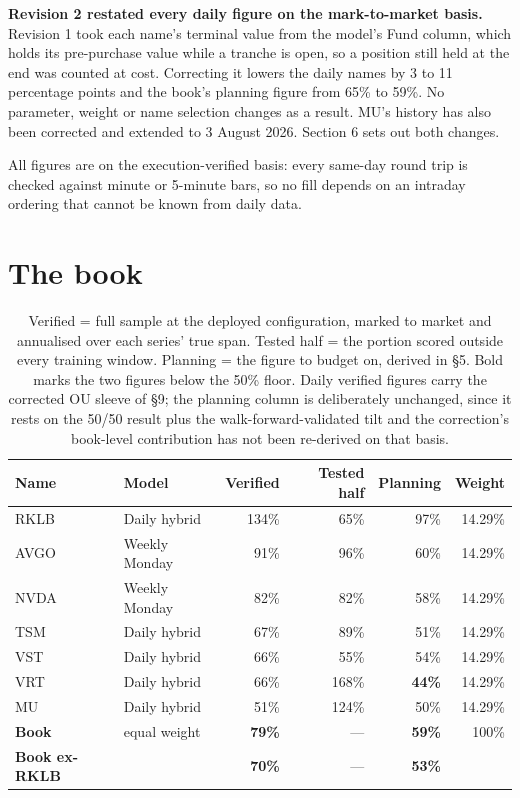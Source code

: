 \documentclass[11pt]{article}
\begin{document}
\begin{titlepage}
{{\textbf{Revision 2 restated every daily figure on the mark-to-market basis.} Revision 1 took each
name's terminal value from the model's Fund column, which holds its pre-purchase value while a
tranche is open, so a position still held at the end was counted at cost. Correcting it lowers
the daily names by 3 to 11 percentage points and the book's planning figure from 65\% to 59\%.
No parameter, weight or name selection changes as a result. MU's history has also been corrected
and extended to 3 August 2026. Section 6 sets out both changes.

All figures are on the execution-verified basis: every same-day round trip is checked against
minute or 5-minute bars, so no fill depends on an intraday ordering that cannot be known from
daily data.}}
\end{titlepage}

\section{The book}

\begin{table}[H]\centering\small
\begin{tabular}{llrrrr}
\toprule
\textbf{Name} & \textbf{Model} & \textbf{Verified} & \textbf{Tested half} & \textbf{Planning} &
\textbf{Weight}\\
\midrule
\rowcolor{bckeep} RKLB & Daily hybrid   & 134\% & 65\%  & 97\%  & 14.29\%\\
AVGO & Weekly Monday  & 91\%  & 96\%  & 60\%  & 14.29\%\\
\rowcolor{bckeep} NVDA & Weekly Monday  & 82\%  & 82\%  & 58\%  & 14.29\%\\
TSM  & Daily hybrid   & 67\%  & 89\%  & 51\%  & 14.29\%\\
\rowcolor{bckeep} VST  & Daily hybrid   & 66\%  & 55\%  & 54\%  & 14.29\%\\
VRT  & Daily hybrid   & 66\%  & 168\% & \textbf{44\%} & 14.29\%\\
\rowcolor{bckeep} MU   & Daily hybrid   & 51\%  & 124\% & 50\%  & 14.29\%\\
\midrule
\textbf{Book} & equal weight & \textbf{79\%} & --- & \textbf{59\%} & 100\%\\
\textbf{Book ex-RKLB} & & \textbf{70\%} & --- & \textbf{53\%} & \\
\bottomrule
\end{tabular}
\caption{Verified = full sample at the deployed configuration, marked to market and annualised
over each series' true span. Tested half = the portion scored outside every training window.
Planning = the figure to budget on, derived in \S5. Bold marks the two figures below the 50\%
floor. Daily verified figures carry the corrected OU sleeve of \S9; the planning column is
deliberately unchanged, since it rests on the 50/50 result plus the walk-forward-validated tilt
and the correction's book-level contribution has not been re-derived on that basis.}
\end{table}
\end{document}
